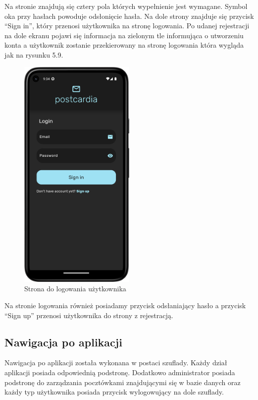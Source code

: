 \documentclass[a4paper,twoside,12pt]{book}
\begin{document}
Na stronie znajdują się cztery pola których wypełnienie jest wymagane. Symbol oka przy hasłach powoduje odsłonięcie hasła. Na dole strony znajduje się przycisk ``Sign in'', który przenosi użytkownika na stronę logowania. 
Po udanej rejestracji na dole ekranu pojawi się informacja na zielonym tle informująca o utworzeniu konta a użytkownik zostanie przekierowany na stronę logowania która wygląda jak na rysunku 5.9.

\begin{figure}[H]
    \centering
    \includegraphics[width=0.5\textwidth]{mobile_ss/logowanie.png}
    \caption{Strona do logowania użytkownika}
\end{figure}

Na stronie logowania również posiadamy przycisk odsłaniający hasło a przycisk ``Sign up'' przenosi użytkownika do strony z rejestracją. 

\subsection{Nawigacja po aplikacji}
Nawigacja po aplikacji została wykonana w postaci szuflady. Każdy dział aplikacji posiada odpowiednią podstronę. Dodatkowo administrator posiada podstronę do zarządzania pocztówkami znajdującymi się w bazie danych oraz każdy typ użytkownika posiada przycisk wylogowujący na dole szuflady.
\end{document}
